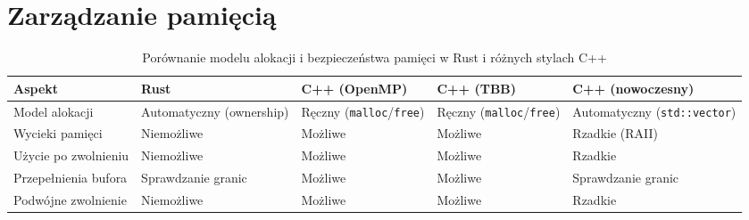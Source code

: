 \section{Zarządzanie pamięcią}
\begin{table}[H]
    \centering
    \caption{Porównanie modelu alokacji i bezpieczeństwa pamięci w Rust i różnych stylach C++}
    \begin{tabularx}{\textwidth}{lXXXX}
    \toprule
    \textbf{Aspekt} &
    \textbf{Rust} &
    \textbf{C++ (OpenMP)} &
    \textbf{C++ (TBB)} &
    \textbf{C++ (nowoczesny)} \\
    \midrule
    Model alokacji &
    Automatyczny (ownership) &
    Ręczny (\texttt{malloc}/\texttt{free}) &
    Ręczny (\texttt{malloc}/\texttt{free}) &
    Automatyczny (\texttt{std::vector}) \\
    
    Wycieki pamięci &
    Niemożliwe &
    Możliwe &
    Możliwe &
    Rzadkie (RAII) \\
    
    Użycie po zwolnieniu &
    Niemożliwe &
    Możliwe &
    Możliwe &
    Rzadkie \\
    
    Przepełnienia bufora &
    Sprawdzanie granic &
    Możliwe &
    Możliwe &
    Sprawdzanie granic \\
    
    Podwójne zwolnienie &
    Niemożliwe &
    Możliwe &
    Możliwe &
    Rzadkie \\
    \bottomrule
    \end{tabularx}
\end{table}
